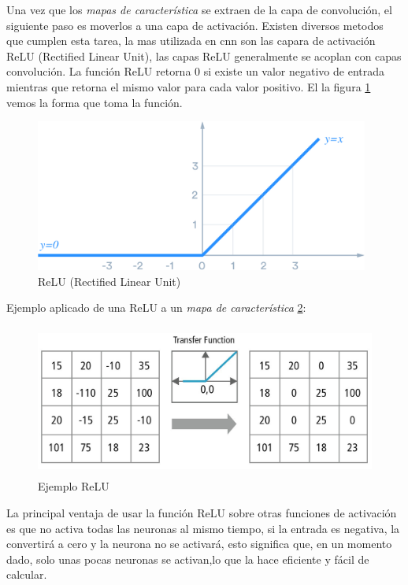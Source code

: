 Una vez que los \textit{mapas de característica} se extraen de la capa de convolución, el siguiente paso es moverlos a una capa de activación. Existen diversos metodos que cumplen esta tarea, la mas utilizada en  \ac{cnn} son las capara de activación ReLU (Rectified Linear Unit), las capas ReLU generalmente se acoplan con capas convolución. La función ReLU retorna 0 si existe un valor negativo de entrada mientras que retorna el mismo valor para cada valor positivo. El la figura  \ref{Fig:relu} vemos la forma que toma la función.

\begin{figure}[H]
 \centering
  \includegraphics[height=5cm,keepaspectratio=true,clip=true]{imagenes/MarcoTeorico/ReLU_1.png}
  \caption{ReLU (Rectified Linear Unit)} \label{Fig:relu}
\end{figure}

Ejemplo aplicado de una ReLU a un \textit{mapa de característica} \ref{Fig:relu2}:
\begin{figure}[H]
 \centering
  \includegraphics[height=5cm,keepaspectratio=true,clip=true]{imagenes/MarcoTeorico/ReLU_2.jpeg}
  \caption{Ejemplo ReLU } \label{Fig:relu2}
\end{figure}

La principal ventaja de usar la función ReLU sobre otras funciones de activación es que no activa todas las neuronas al mismo tiempo, si la entrada es negativa, la convertirá a cero y la neurona no se activará, esto significa que, en un momento dado, solo unas pocas neuronas se activan,lo que la hace eficiente y fácil de calcular.


